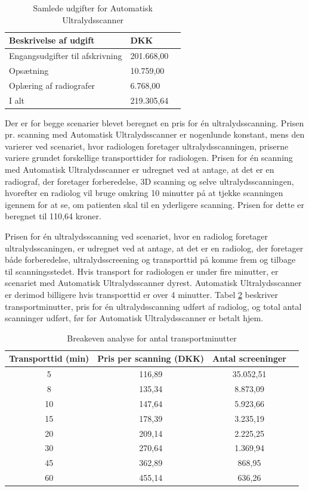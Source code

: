 \begin{table}[htb]
\centering
\begin{tabular}{ | l | l | p{} | }
\hline
\textbf{Beskrivelse af udgift} & \textbf{DKK} \\\hline
Engangsudgifter til afskrivning & 201.668,00 \\\hline
Opsætning & 10.759,00 \\\hline
Oplæring af radiografer & 6.768,00 \\\hline
I alt & 219.305,64 \\\hline
\end{tabular}
\caption{Samlede udgifter for Automatisk Ultralydsscanner}
\label{FasteOmkostninger}
\end{table}

Der er for begge scenarier blevet beregnet en pris for én ultralydsscanning. Prisen pr. scanning med Automatisk Ultralydsscanner er nogenlunde konstant, mens den varierer ved scenariet, hvor radiologen foretager ultralydsscanningen, priserne variere grundet forskellige transporttider for radiologen.  
Prisen for én scanning med Automatisk Ultralydsscanner er udregnet ved at antage, at det er en radiograf, der foretager forberedelse, 3D scanning og selve ultralydsscanningen, hvorefter en radiolog vil bruge omkring 10 minutter på at tjekke scanningen igennem for at se, om patienten skal til en yderligere scanning. Prisen for dette er beregnet til 110,64 kroner. 

Prisen for én ultralydsscanning ved scenariet, hvor en radiolog foretager ultralydsscaningen, er udregnet ved at antage, at det er en radiolog, der foretager både forberedelse, ultralydsscreening og transporttid på komme frem og tilbage til scanningsstedet. Hvis transport for radiologen er under fire minutter, er scenariet med Automatisk Ultralydsscanner dyrest. Automatisk Ultralydsscanner er derimod billigere hvis transporttid er over 4 minutter. Tabel \ref{Breakeven} beskriver transportminutter, pris for én ultralydsscanning udført af radiolog, og total antal scanninger udført, før før Automatisk Ultralydsscanner er betalt hjem. 

\begin{table}[htb]
\centering
\begin{tabular}{ | c | c | c | p{} | }
\hline
\textbf{Transporttid (min)} & \textbf{Pris per scanning (DKK)} & \textbf{Antal screeninger} \\\hline
5 & 116,89 & 35.052,51 \\\hline
8 & 135,34 & 8.873,09\\\hline
10 & 147,64 & 5.923,66\\\hline
15 & 178,39 & 3.235,19 \\\hline
20 & 209,14 & 2.225,25\\\hline
30 & 270,64 & 1.369,94\\\hline
45 & 362,89 & 868,95 \\\hline
60 & 455,14 & 636,26 \\\hline
\end{tabular}
\caption{Breakeven analyse for antal transportminutter}
\label{Breakeven}
\end{table}

